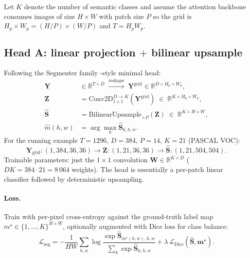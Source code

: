 \documentclass[11pt,a4paper]{article}
\begin{document}
Let $K$ denote the number of semantic classes and assume the
attention backbone consumes images of size $H\!\times\!W$ with patch
size $P$ so the grid is $H_p\!\times\!W_p = (H/P)\!\times\!(W/P)$ and
$T = H_p W_p$.

\subsection{Head A: linear projection \texorpdfstring{$+$}{+} bilinear upsample}
\label{sec:seg-A}

Following the Segmenter family \cite{vssd}-style minimal head:
\begin{align}
  \bm{Y} &\in\mathbb{R}^{T\times D}
       \;\xrightarrow{\text{reshape}}\;
       \bm{Y}^{\text{grid}}\in\mathbb{R}^{D\times H_p\times W_p}, \\
  \bm{Z} &= \mathrm{Conv2D}_{1\times 1}^{D\to K}(\bm{Y}^{\text{grid}})
       \;\in\;\mathbb{R}^{K\times H_p\times W_p}, \label{eq:seg-A-logits}\\
  \widehat{\bm{S}} &= \mathrm{BilinearUpsample}_{\times P}(\bm{Z})
       \;\in\;\mathbb{R}^{K\times H\times W}, \\
  \widehat{m}(h,w) &= \arg\max_{k}\widehat{\bm{S}}_{k,h,w}.
\end{align}
For the running example $T\!=\!1296$, $D\!=\!384$, $P\!=\!14$,
$K\!=\!21$ (PASCAL VOC):
\begin{equation}
  \bm{Y}_{\text{grid}}:(1,384,36,36)
   \to \bm{Z}:(1,21,36,36)
   \to \widehat{\bm{S}}:(1,21,504,504).
\end{equation}
Trainable parameters: just the $1{\times}1$ convolution
$\bm{W}\in\mathbb{R}^{K\times D}$ ($D K = 384\cdot 21 = 8\,064$
weights). The head is essentially a per-patch linear classifier
followed by deterministic upsampling.

\paragraph{Loss.} Train with per-pixel cross-entropy against the
ground-truth label map $m^\star\in\{1,\dots,K\}^{H\times W}$,
optionally augmented with Dice loss for class balance:
\begin{equation}
  \mathcal{L}_{\text{seg}}
   = -\frac{1}{HW}\sum_{h,w}\log
     \frac{\exp \widehat{\bm{S}}_{m^\star(h,w),h,w}}
          {\sum_{k}\exp \widehat{\bm{S}}_{k,h,w}}
   + \lambda\,\mathcal{L}_{\text{Dice}}(\widehat{\bm{S}},\bm{m}^\star).
\end{equation}
\end{document}

